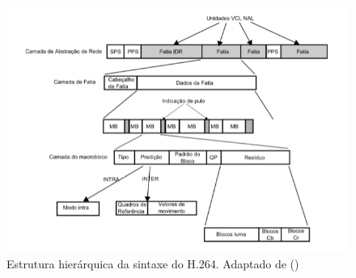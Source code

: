 		\begin{figure}[H]
			\centering
			\includegraphics[width=1\textwidth]{figuras/h264}
			\caption[Estrutura hierárquica da sintaxe do H.264]{Estrutura hierárquica da sintaxe do H.264. Adaptado de  (\citeyear{richardson})}
			\label{img:estruturah264}
		\end{figure}
